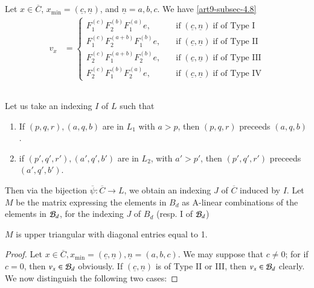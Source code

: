 \subsection{}\label{art9-subsec-6.4}
Let $x \in \overline{C}$, $x_{\min} = (\underline{c}, \underline{n})$, and $\underline{n}={a,b,c}$. We have \eqref{art9-subsec-4.8}
\begin{align*}
v_{x} &=
\begin{cases}
F_{1}^{(c)}F_{2}^{(b)}F_{1}^{(a)}e, \quad & \text{if} \;(\underline{c}, \underline{n})\; \text{if of Type I}\\
F_{1}^{(c)}F_{2}^{(a+b)}F_{1}^{(b)}e, \quad & \text{if} \;(\underline{c}, \underline{n})\; \text{if of Type II}\\
F_{2}^{(c)}F_{1}^{(a+b)}F_{2}^{(b)}e, \quad & \text{if} \;(\underline{c}, \underline{n})\; \text{if of Type III}\\
F_{2}^{(c)}F_{1}^{(b)}F_{2}^{(a)}e, \quad & \text{if} \;(\underline{c}, \underline{n})\; \text{if of Type IV}
\end{cases}
\end{align*}

\subsection{}\label{art9-subsec-6.5}
Let us take an indexing $I$ of $L$ such that
\begin{enumerate}[(1)]
\item If $(p,q,r), (a,q,b)$ are in $L_{1}$ with $a > p$, then $(p,q,r)$ preceeds $(a, q, b)$.\label{art9-subsec6.5-enum-1}

\item if $(p',q',r'), (a',q', b')$ are in $L_{2}$, with $a' > p'$, then $(p',q',r')$
preceeds $(a',q', b')$. \label{art9-subsec6.5-enum-2}
\end{enumerate}

Then via the bijection $\overline{\psi} : \overline{C} \longrightarrow L$, we obtain an indexing $J$ of $\overline{C}$ induced by $I$. Let $M$ be the matrix expressing the elements in $B_{d}$ as A-linear combinations of the elements in $\mathcal{B}_{d}$, for the indexing $J$ of $B_{d}$ (resp. I of $\mathcal{B}_{d}$)

\setcounter{thrm}{5}
\begin{thrm}\label{art9-thm-6.6}
$M$ is upper triangular with diagonal entries equal to 1.
\end{thrm}

\begin{proof}
Let $x \in \overline{C}, x_{\min} =(\underline{c}, \underline{n}), \underline{n} = (a,b,c)$. We may suppose that $c\neq 0$; for if $c = 0$, then $ v_{x} \in \mathcal{B}_{d}$ obviously. If $ (\underline{c}, \underline{n})$ is of Type II or III, then $v_{x} \in \mathcal{B}_{d}$ clearly. We now distinguish the following two cases:
\end{proof}

